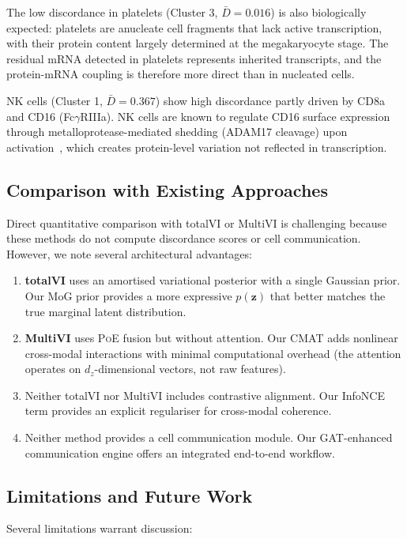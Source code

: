 \documentclass[11pt,a4paper]{article}
\newcommand{\poe}{\textsc{PoE}}
\newcommand{\bz}{\mathbf{z}}
\begin{document}
The low discordance in platelets (Cluster 3, $\bar{D}=0.016$) is also biologically expected: platelets are anucleate cell fragments that lack active transcription, with their protein content largely determined at the megakaryocyte stage.
The residual mRNA detected in platelets represents inherited transcripts, and the protein-mRNA coupling is therefore more direct than in nucleated cells.

NK cells (Cluster 1, $\bar{D}=0.367$) show high discordance partly driven by CD8a and CD16 (Fc$\gamma$RIIIa).
NK cells are known to regulate CD16 surface expression through metalloprotease-mediated shedding (ADAM17 cleavage) upon activation~\citep{romee2013}, which creates protein-level variation not reflected in transcription.

\subsection{Comparison with Existing Approaches}

Direct quantitative comparison with totalVI or MultiVI is challenging because these methods do not compute discordance scores or cell communication.
However, we note several architectural advantages:

\begin{enumerate}[leftmargin=*]
  \item \textbf{totalVI} uses an amortised variational posterior with a single Gaussian prior.
    Our MoG prior provides a more expressive $p(\bz)$ that better matches the true marginal latent distribution.
  \item \textbf{MultiVI} uses \poe{} fusion but without attention.
    Our CMAT adds nonlinear cross-modal interactions with minimal computational overhead (the attention operates on $d_z$-dimensional vectors, not raw features).
  \item Neither totalVI nor MultiVI includes contrastive alignment.
    Our InfoNCE term provides an explicit regulariser for cross-modal coherence.
  \item Neither method provides a cell communication module.
    Our GAT-enhanced communication engine offers an integrated end-to-end workflow.
\end{enumerate}

\subsection{Limitations and Future Work}

Several limitations warrant discussion:
\end{document}

